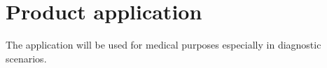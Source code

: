 \section{Product application}
The application will be used for medical purposes especially in diagnostic scenarios. 